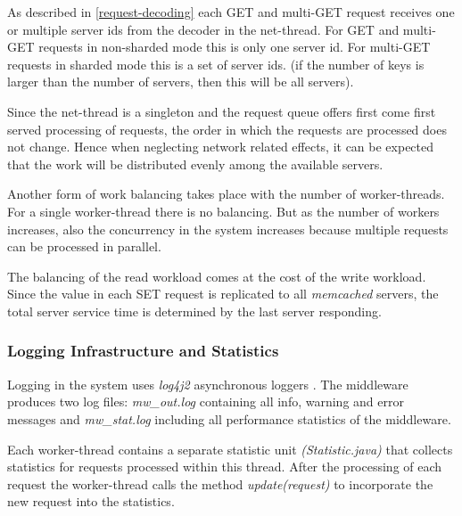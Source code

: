 \documentclass[report.tex]{subfiles}
\begin{document}
As described in \ref{request-decoding} each GET and multi-GET request receives one or multiple server ids from the decoder in the net-thread.
For GET and multi-GET requests in non-sharded mode this is only one server id. For multi-GET requests in sharded mode this is a set of server ids. (if the number of keys is larger than the number of servers, then this will be all servers).

Since the net-thread is a singleton and the request queue offers first come first served processing of requests, the order in which the requests are processed does not change. Hence when neglecting network related effects, it can be expected that the work will be distributed evenly among the available servers.

Another form of work balancing takes place with the number of worker-threads. For a single worker-thread there is no balancing. But as the number of workers increases, also the concurrency in the system increases because multiple requests can be processed in parallel.

The balancing of the read workload comes at the cost of the write workload. Since the value in each SET request is replicated to all \emph{memcached} servers, the total server service time is determined by the last server responding.


\subsubsection{Logging Infrastructure and Statistics}

Logging in the system uses \emph{log4j2} asynchronous loggers \cite{log4j2}. The middleware produces two log files: \emph{mw\_out.log} containing all info, warning and error messages and \emph{mw\_stat.log} including all performance statistics of the middleware.

Each worker-thread contains a separate statistic unit \emph{(Statistic.java)} that collects statistics for requests processed within this thread.
After the processing of each request the worker-thread calls the method \emph{update(request)} to incorporate the new request into the statistics.  
\end{document}
